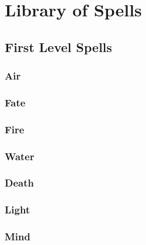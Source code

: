 \chapter{Library of Spells}

\section{First Level Spells}

\begin{multicols}{2}

\subsection{Air}



\subsection{Fate}



\subsection{Fire}



\subsection{Water}



\subsection{Death}



\subsection{Light}



\subsection{Mind}



\end{multicols}

